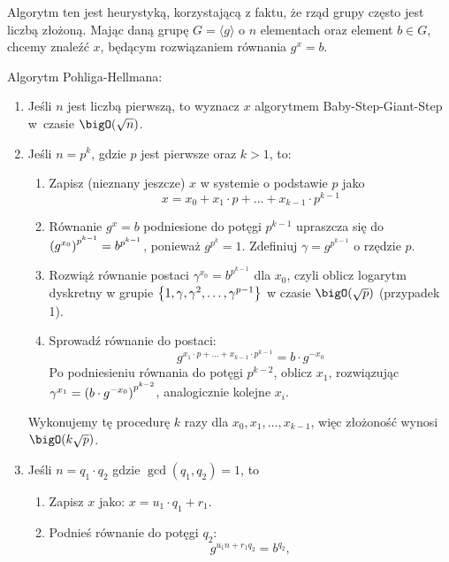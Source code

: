 Algorytm ten jest heurystyką, korzystającą z faktu, że rząd grupy często jest liczbą złożoną. Mając daną grupę \( G = \langle g \rangle \) o \( n \) elementach oraz element \( b \in G \), chcemy znaleźć \( x \), będącym rozwiązaniem równania \( g^x = b \).
\begin{greyframe}
    Algorytm Pohliga-Hellmana:
    \begin{enumerate}[I]
        \item Jeśli \( n \) jest liczbą pierwszą, to wyznacz \( x \) algorytmem Baby-Step-Giant-Step w~czasie \( \bigO(\sqrt{n}) \).
        \item Jeśli \( n = p^k \), gdzie \( p \) jest pierwsze oraz \( k > 1 \), to:
            \begin{enumerate}
                \item Zapisz (nieznany jeszcze) \( x \) w systemie o podstawie \( p \) jako 
                \[
                    x = x_0 + x_1 \cdot p + \ldots + x_{k-1} \cdot p^{k-1}
                \]
                \item Równanie \( g^x = b \) podniesione do potęgi \( p^{k-1} \) upraszcza się do \( \left(g^{x_0}\right)^{p^{k-1}} = b^{p^{k-1}} \), ponieważ \( g^{p^k} = 1 \). Zdefiniuj \( \gamma = g^{p^{k-1}} \) o rzędzie \( p \).
                \item Rozwiąż równanie postaci \( \gamma^{x_0} = b^{p^{k-1}} \) dla \( x_0 \), czyli oblicz logarytm dyskretny w grupie \( \set{1, \gamma, \gamma^2, \ldots, \gamma^{p-1}} \) w czasie \( \bigO(\sqrt{p}) \) (przypadek 1).
                \item Sprowadź równanie do postaci: 
                \[
                    g^{x_1 \cdot p + \ldots + x_{k-1} \cdot p^{k-1}} = b \cdot g^{-x_0}
                \]
                Po podniesieniu równania do potęgi \( p^{k-2} \), oblicz \( x_1 \), rozwiązując \( \gamma^{x_1} = \left(b \cdot g^{-x_0}\right)^{p^{k-2}} \), analogicznie kolejne \( x_i \).
            \end{enumerate}
        Wykonujemy tę procedurę \( k \) razy dla \( x_0, x_1, \ldots, x_{k-1} \), więc złożoność wynosi \( \bigO(k \sqrt{p}) \).
        \item Jeśli \( n  = q_1 \cdot q_2 \) gdzie \( \gcd(q_1, q_2) = 1 \), to
        \begin{enumerate}
            \item Zapisz \( x \) jako: \( x = u_1 \cdot q_1 + r_1 \).
            \item Podnieś równanie do potęgi \( q_2\):
            \[
                g^{u_1n + r_1q_2} = b^{q_2},
\]
\end{enumerate}
\end{enumerate}
\end{greyframe}
